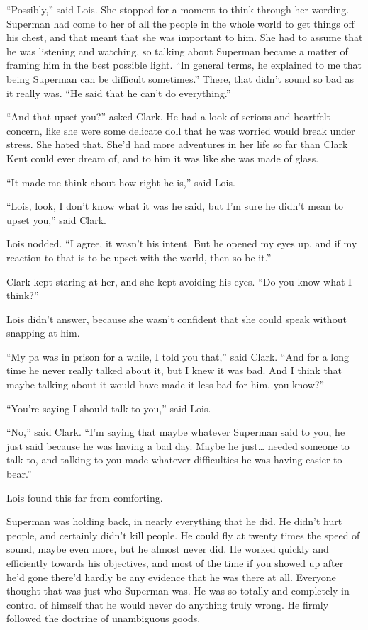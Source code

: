 \documentclass[ebook,12pt]{memoir}
\begin{document}
``Possibly,'' said Lois. She stopped for a moment to think through her
wording. Superman had come to her of all the people in the whole world
to get things off his chest, and that meant that she was important to
him. She had to assume that he was listening and watching, so talking
about Superman became a matter of framing him in the best possible
light. ``In general terms, he explained to me that being Superman can be
difficult sometimes.'' There, that didn't sound so bad as it really was.
``He said that he can't do everything.''

``And that upset you?'' asked Clark. He had a look of serious and
heartfelt concern, like she were some delicate doll that he was worried
would break under stress. She hated that. She'd had more adventures in
her life so far than Clark Kent could ever dream of, and to him it was
like she was made of glass.

``It made me think about how right he is,'' said Lois.

``Lois, look, I don't know what it was he said, but I'm sure he didn't
mean to upset you,'' said Clark.

Lois nodded. ``I agree, it wasn't his intent. But he opened my eyes up,
and if my reaction to that is to be upset with the world, then so be
it.''

Clark kept staring at her, and she kept avoiding his eyes. ``Do you know
what I think?''

Lois didn't answer, because she wasn't confident that she could speak
without snapping at him.

``My pa was in prison for a while, I told you that,'' said Clark. ``And
for a long time he never really talked about it, but I knew it was bad.
And I think that maybe talking about it would have made it less bad for
him, you know?''

``You're saying I should talk to you,'' said Lois.

``No,'' said Clark. ``I'm saying that maybe whatever Superman said to
you, he just said because he was having a bad day. Maybe he just\ldots{}
needed someone to talk to, and talking to you made whatever difficulties
he was having easier to bear.''

Lois found this far from comforting.

Superman was holding back, in nearly everything that he did. He didn't
hurt people, and certainly didn't kill people. He could fly at twenty
times the speed of sound, maybe even more, but he almost never did. He
worked quickly and efficiently towards his objectives, and most of the
time if you showed up after he'd gone there'd hardly be any evidence
that he was there at all. Everyone thought that was just who Superman
was. He was so totally and completely in control of himself that he
would never do anything truly wrong. He firmly followed the doctrine of
unambiguous goods.
\end{document}
